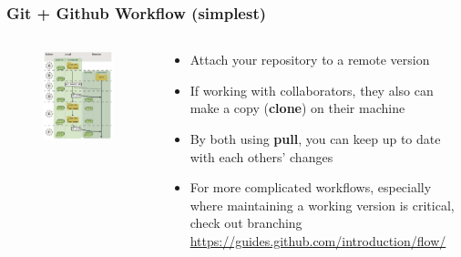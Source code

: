 \documentclass{beamer}
\newcommand{\code}[1]{{\fontfamily{pcr}\selectfont \textbf{#1}}}
\begin{document}
\begin{frame}
\frametitle{Git + Github Workflow (simplest)}

\begin{columns}
	\begin{column}{0.55\linewidth}
		\begin{figure}
			\includegraphics[width=\linewidth]{images/remote-workflow}
		\end{figure}
	\end{column}
	\begin{column}{0.45\linewidth}
		\begin{itemize}
			\item<1-> Attach your repository to a remote version
			\item<2-> If working with collaborators, they also can make a copy (\code{clone}) on their machine
			\item<3-> By both using \code{pull}, you can keep up to date with each others' changes
			\item<4-> For more complicated workflows, especially where maintaining a working version is critical, check out branching \url{https://guides.github.com/introduction/flow/}
		\end{itemize}
	\end{column}
\end{columns}


\end{frame}
\end{document}
